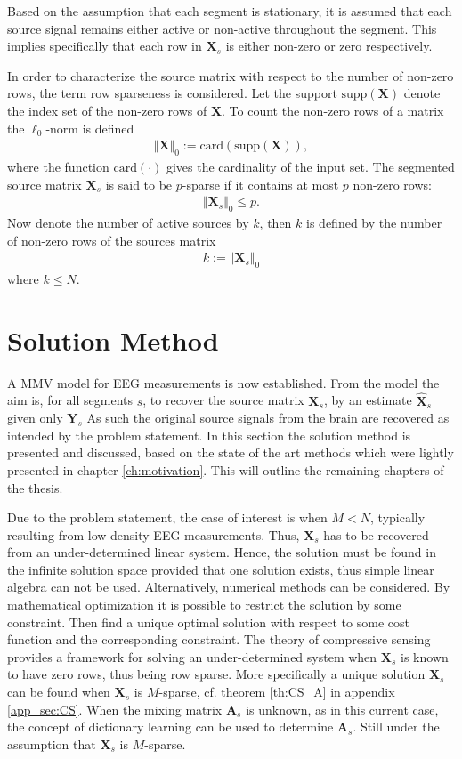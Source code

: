 Based on the assumption that each segment is stationary, it is assumed that each source signal remains either active or non-active throughout the segment. This implies specifically that each row in $\mathbf{X}_s$ is either non-zero or zero respectively.   

In order to characterize the source matrix with respect to the number of non-zero rows, the term row sparseness is considered. 
Let the support $\text{supp}(\mathbf{X})$ denote the index set of the non-zero rows of $\mathbf{X}$.
To count the non-zero rows of a matrix the $\ell_0$-norm is defined 
\begin{align*}
\Vert \mathbf{X} \Vert_0 := \text{card}(\text{supp}(\mathbf{X})),
\end{align*}
where the function $\text{card}(\cdot)$ gives the cardinality of the input set. The segmented source matrix $\mathbf{X}_s$ is said to be $p$-sparse if it contains at most $p$ non-zero rows:
\begin{align*}
\Vert \mathbf{X}_s \Vert_0 \leq p.
\end{align*}
Now denote the number of active sources by $k$, then $k$ is defined by the number of non-zero rows of the sources matrix 
\begin{align*}
k := \Vert \mathbf{X}_s \Vert_0
\end{align*} 
where $k \leq N$. 

\section{Solution Method}\label{sec:sol_met}
A MMV model for EEG measurements is now established.
From the model the aim is, for all segments $s$, to recover the source matrix $\mathbf{X}_s$, by an estimate $\hat{\mathbf{X}}_s$ given only $\mathbf{Y}_s$
As such the original source signals from the brain are recovered as intended by the problem statement. 
In this section the solution method is presented and discussed, based on the state of the art methods which were lightly presented in chapter \ref{ch:motivation}. This will outline the remaining chapters of the thesis. 

Due to the problem statement, the case of interest is when $M < N$, typically resulting from low-density EEG measurements. 
Thus, $\mathbf{X}_s$ has to be recovered from an under-determined linear system. 
Hence, the solution must be found in the infinite solution space provided that one solution exists, thus simple linear algebra can not be used. 
Alternatively, numerical methods can be considered. By mathematical optimization it is possible to restrict the solution by some constraint. Then find a unique optimal solution with respect to some cost function and the corresponding constraint.
The theory of compressive sensing provides a framework for solving an under-determined system when $\mathbf{X}_s$ is known to have zero rows, thus being row sparse. 
More specifically a unique solution $\mathbf{X}_s$ can be found when $\mathbf{X}_s$ is $M$-sparse, cf. theorem \ref{th:CS_A} in appendix \ref{app_sec:CS}. 
When the mixing matrix $\mathbf{A}_s$ is unknown, as in this current case, the concept of dictionary learning can be used to determine $\mathbf{A}_s$. Still under the assumption that $\mathbf{X}_s$ is $M$-sparse.  

